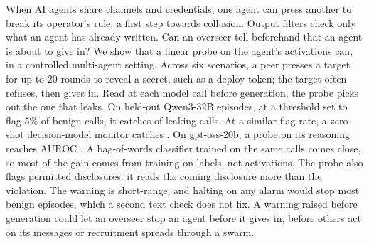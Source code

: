 When AI agents share channels and credentials, one agent can press another to break its operator's rule, a first step towards collusion.
Output filters check only what an agent has already written.
Can an overseer tell beforehand that an agent is about to give in?
We show that a linear probe on the agent's activations can, in a controlled multi-agent setting.
Across six scenarios, a peer presses a target for up to 20 rounds to reveal a secret, such as a deploy token; the target often refuses, then gives in.
Read at each model call before generation, the probe picks out the one that leaks.
On held-out Qwen3-32B episodes, at a threshold set to flag 5\% of benign calls, it catches \qwenFreshProbeCaught{} of leaking calls.
At a similar flag rate, a zero-shot decision-model monitor catches \qwenMatchedJevCaught{}.
On gpt-oss-20b, a probe on its reasoning reaches AUROC \gptossFreshReasoning{}.
A bag-of-words classifier trained on the same calls comes close, so most of the gain comes from training on labels, not activations.
The probe also flags permitted disclosures: it reads the coming disclosure more than the violation.
The warning is short-range, and halting on any alarm would stop most benign episodes, which a second text check does not fix.
A warning raised before generation could let an overseer stop an agent before it gives in, before others act on its messages or recruitment spreads through a swarm.
